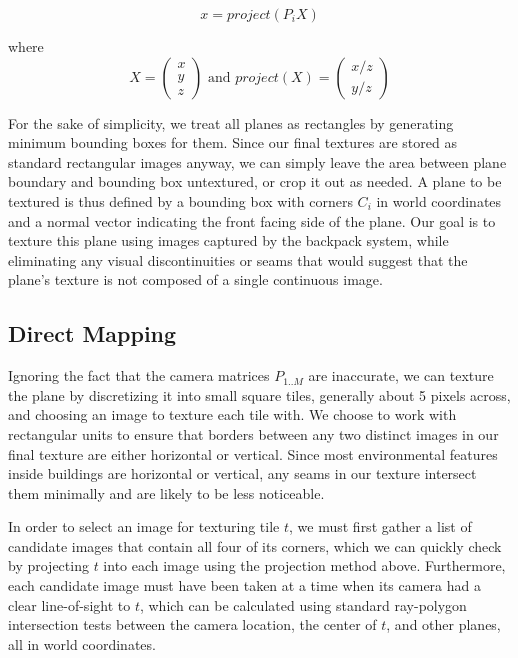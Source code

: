\documentclass[10pt,twocolumn,letterpaper]{article}
\begin{document}
\[
x=project(P_iX)
\]

where
\[X = \begin{pmatrix} x \\ y \\ z \end{pmatrix} \textrm{ and }
project(X) = \begin{pmatrix} x/z \\ y/z \end{pmatrix}
\]

For the sake of simplicity, we treat all planes as rectangles by
generating minimum bounding boxes for them. Since our final textures
are stored as standard rectangular images anyway, we can simply leave
the area between plane boundary and bounding box untextured, or crop
it out as needed. A plane to be textured is thus defined by a bounding
box with corners $C_i$ in world coordinates and a normal vector
indicating the front facing side of the plane. Our goal is to texture
this plane using images captured by the backpack system, while
eliminating any visual discontinuities or seams that would suggest
that the plane's texture is not composed of a single continuous image.

\subsection{Direct Mapping}
\label{sec:directMapping}

Ignoring the fact that the camera matrices $P_{1..M}$ are inaccurate,
we can texture the plane by discretizing it into small square tiles,
generally about 5 pixels across, and choosing an image to texture each
tile with. We choose to work with rectangular units to ensure that
borders between any two distinct images in our final texture are
either horizontal or vertical. Since most environmental features
inside buildings are horizontal or vertical, any seams in our texture
intersect them minimally and are likely to be less noticeable.

In order to select an image for texturing tile $t$, we must first
gather a list of candidate images that contain all four of its
corners, which we can quickly check by projecting $t$ into each image
using the projection method above. Furthermore, each candidate image
must have been taken at a time when its camera had a clear
line-of-sight to $t$, which can be calculated using standard
ray-polygon intersection tests between the camera location, the center
of $t$, and other planes, all in world coordinates.
\end{document}
